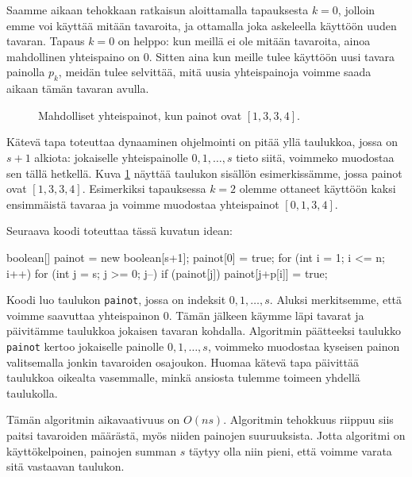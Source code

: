 Saamme aikaan tehokkaan ratkaisun aloittamalla tapauksesta
$k=0$, jolloin emme voi käyttää mitään tavaroita,
ja ottamalla joka askeleella käyttöön uuden tavaran.
Tapaus $k=0$ on helppo: kun meillä ei ole mitään tavaroita,
ainoa mahdollinen yhteispaino on $0$.
Sitten aina kun meille tulee käyttöön uusi tavara painolla $p_k$,
meidän tulee selvittää, mitä uusia yhteispainoja voimme saada
aikaan tämän tavaran avulla.

\begin{figure}
\center
{}
\caption{Mahdolliset yhteispainot, kun painot ovat $[1,3,3,4]$.}
\label{fig:reppak}
\end{figure}

Kätevä tapa toteuttaa dynaaminen ohjelmointi on pitää yllä
taulukkoa, jossa on $s+1$ alkiota: jokaiselle yhteispainolle
$0,1,\dots,s$ tieto siitä, voimmeko muodostaa sen tällä hetkellä.
Kuva \ref{fig:reppak} näyttää taulukon sisällön esimerkissämme, jossa painot ovat
$[1,3,3,4]$. Esimerkiksi tapauksessa $k=2$ olemme ottaneet käyttöön
kaksi ensimmäistä tavaraa ja voimme muodostaa yhteispainot $[0,1,3,4]$.

Seuraava koodi toteuttaa tässä kuvatun idean:

\begin{code}
boolean[] painot = new boolean[s+1];
painot[0] = true;
for (int i = 1; i <= n; i++) {
    for (int j = s; j >= 0; j--) {
        if (painot[j]) painot[j+p[i]] = true;
    }
}
\end{code}

Koodi luo taulukon \texttt{painot}, jossa on indeksit $0,1,\dots,s$.
Aluksi merkitsemme, että voimme saavuttaa yhteispainon $0$.
Tämän jälkeen käymme läpi tavarat ja päivitämme taulukkoa
jokaisen tavaran kohdalla.
Algoritmin päätteeksi taulukko \texttt{painot} kertoo
jokaiselle painolle $0,1,\dots,s$, voimmeko muodostaa kyseisen
painon valitsemalla jonkin tavaroiden osajoukon.
Huomaa kätevä tapa päivittää taulukkoa oikealta vasemmalle,
minkä ansiosta tulemme toimeen yhdellä taulukolla.

Tämän algoritmin aikavaativuus on $O(ns)$.
Algoritmin tehokkuus riippuu siis paitsi tavaroiden määrästä,
myös niiden painojen suuruuksista.
Jotta algoritmi on käyttökelpoinen, painojen summan $s$
täytyy olla niin pieni, että voimme varata sitä
vastaavan taulukon.